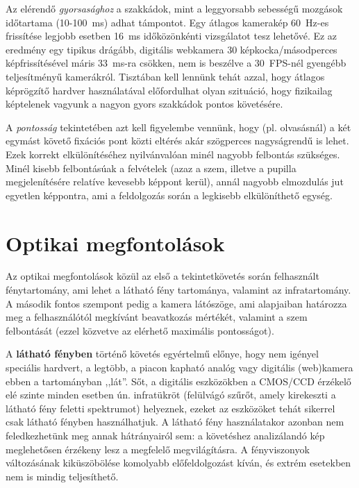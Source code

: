 Az elérendő \textit{gyorsasághoz} a szakkádok, mint a leggyorsabb sebességű mozgások időtartama (10-100~ms) adhat támpontot. Egy átlagos kamerakép 60~Hz-es frissítése legjobb esetben 16~ms időközönkénti vizsgálatot tesz lehetővé. Ez az eredmény egy tipikus drágább, digitális webkamera 30 képkocka/másodperces képfrissítésével máris 33~ms-ra csökken, nem is beszélve a 30~FPS-nél gyengébb teljesítményű kamerákról. Tisztában kell lennünk tehát azzal, hogy átlagos képrögzítő hardver használatával előfordulhat olyan szituáció, hogy fizikailag képtelenek vagyunk a nagyon gyors szakkádok pontos követésére.

A \textit{pontosság} tekintetében azt kell figyelembe vennünk, hogy (pl. olvasásnál) a két egymást követő fixációs pont közti eltérés akár szögperces nagyságrendű is lehet. Ezek korrekt elkülönítéséhez nyilvánvalóan minél nagyobb felbontás szükséges. Minél kisebb felbontásúak a felvételek (azaz a szem, illetve a pupilla megjelenítésére relatíve kevesebb képpont kerül), annál nagyobb elmozdulás jut egyetlen képpontra, ami a feldolgozás során a legkisebb elkülöníthető egység.


\section{Optikai megfontolások}\label{sect:hw_optikai}

Az optikai megfontolások közül az első a tekintetkövetés során felhasznált fénytartomány, ami lehet a látható fény tartománya, valamint az infratartomány. A második fontos szempont pedig a kamera látószöge, ami alapjaiban határozza meg a felhasználótól megkívánt beavatkozás mértékét, valamint a szem felbontását (ezzel közvetve az elérhető maximális pontosságot).

\bigskip

A \textbf{látható fényben} történő követés egyértelmű előnye, hogy nem igényel speciális hardvert, a legtöbb, a piacon kapható analóg vagy digitális (web)kamera ebben a tartományban ,,lát''. Sőt, a digitális eszközökben a CMOS/CCD érzékelő elé szinte minden esetben ún. infratükröt (felülvágó szűrőt, amely kirekeszti a látható fény feletti spektrumot) helyeznek, ezeket az eszközöket tehát sikerrel csak látható fényben használhatjuk. A látható fény használatakor azonban nem feledkezhetünk meg annak hátrányairól sem: a követéshez analizálandó kép meglehetősen érzékeny lesz a megfelelő megvilágításra. A fényviszonyok változásának kiküszöbölése komolyabb előfeldolgozást kíván, és extrém esetekben nem is mindig teljesíthető.

